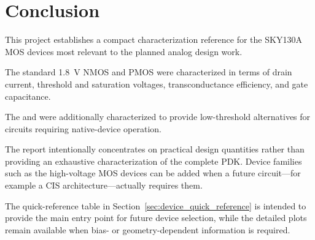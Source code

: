 
\section{Conclusion}
\label{sec:conclusion}

This project establishes a compact characterization reference for the
SKY130A MOS devices most relevant to the planned analog design work.

The standard \qty{1.8}{\volt} NMOS and PMOS were characterized in terms
of drain current, threshold and saturation voltages,
transconductance efficiency, and gate capacitance.

The  and
 were additionally characterized to provide
low-threshold alternatives for circuits requiring native-device
operation.

The report intentionally concentrates on practical design quantities
rather than providing an exhaustive characterization of the complete
PDK. Device families such as the high-voltage MOS devices can be added
when a future circuit---for example a CIS architecture---actually
requires them.

The quick-reference table in
Section~\ref{sec:device_quick_reference} is intended to provide the
main entry point for future device selection, while the detailed plots
remain available when bias- or geometry-dependent information is
required.